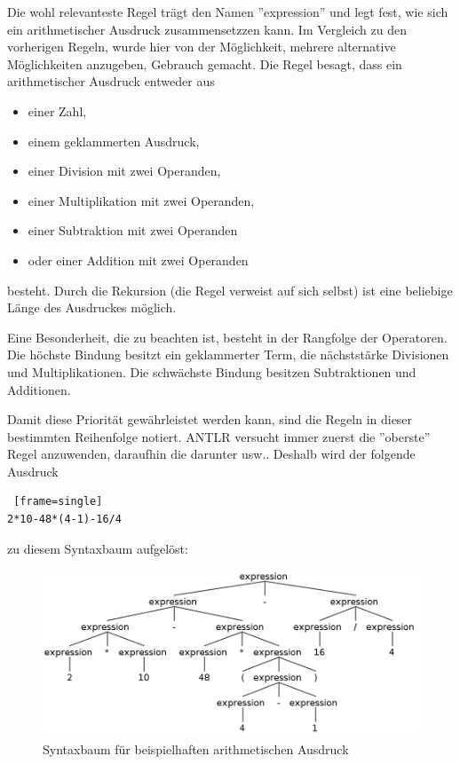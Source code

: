 \documentclass[12pt, a4paper, oneside, ngerman]{article}
\begin{document}
Die wohl relevanteste Regel trägt den Namen ''expression'' und legt fest, wie sich ein arithmetischer Ausdruck zusammensetzzen kann. Im Vergleich zu den vorherigen Regeln, wurde hier von der Möglichkeit, mehrere alternative Möglichkeiten anzugeben, Gebrauch gemacht. Die Regel besagt, dass ein arithmetischer Ausdruck entweder aus 
\begin{itemize}
\item einer Zahl,
\item einem geklammerten Ausdruck,
\item einer Division mit zwei Operanden,
\item einer Multiplikation mit zwei Operanden,
\item einer Subtraktion mit zwei Operanden
\item oder einer Addition mit zwei Operanden
\end{itemize}
besteht.
Durch die Rekursion (die Regel verweist auf sich selbst) ist eine beliebige Länge des Ausdruckes möglich.

Eine Besonderheit, die zu beachten ist, besteht in der Rangfolge der Operatoren. Die höchste Bindung besitzt ein geklammerter Term, die nächststärke Divisionen und Multiplikationen. Die schwächste Bindung besitzen Subtraktionen und Additionen.

Damit diese Priorität gewährleistet werden kann, sind die Regeln in dieser bestimmten Reihenfolge notiert. ANTLR versucht immer zuerst die ''oberste'' Regel anzuwenden, daraufhin die darunter usw.. Deshalb wird der folgende Ausdruck 

\begin{lstlisting} [frame=single]
2*10-48*(4-1)-16/4
\end{lstlisting}

zu diesem Syntaxbaum aufgelöst:

\begin{figure}[h!]
\centering
\includegraphics[scale=0.4]{antlr4_parse_tree_arithmetic.png}
\caption{Syntaxbaum für beispielhaften arithmetischen Ausdruck}
\label{fig:method}
\end{figure}
\end{document}
